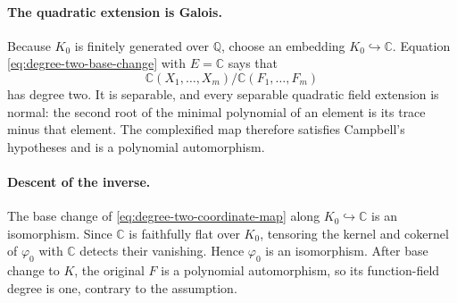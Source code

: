 \paragraph{The quadratic extension is Galois.}
Because \(K_0\) is finitely generated over \(\mathbb Q\), choose an embedding
\(K_0\hookrightarrow\mathbb C\).  Equation
\eqref{eq:degree-two-base-change} with \(E=\mathbb C\) says that
\[
 \mathbb C(X_1,\ldots,X_m)/
 \mathbb C(F_1,\ldots,F_m)
\]
has degree two.  It is separable, and every separable quadratic field
extension is normal: the second root of the minimal polynomial of an element
is its trace minus that element.  The complexified map therefore satisfies
Campbell's hypotheses and is a polynomial automorphism.

\paragraph{Descent of the inverse.}
The base change of \eqref{eq:degree-two-coordinate-map} along
\(K_0\hookrightarrow\mathbb C\) is an isomorphism.  Since \(\mathbb C\) is
faithfully flat over \(K_0\), tensoring the kernel and cokernel of
\(\varphi_0\) with \(\mathbb C\) detects their vanishing.  Hence
\(\varphi_0\) is an isomorphism.  After base change to \(K\), the original
\(F\) is a polynomial automorphism, so its function-field degree is one,
contrary to the assumption.
